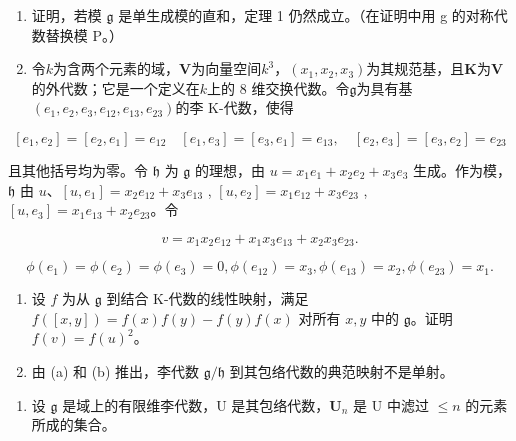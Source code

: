 \begin{enumerate}
\def\labelenumi{\arabic{enumi}.}
\setcounter{enumi}{7}
\item
  证明，若模 \(\mathfrak{g}\) 是单生成模的直和，定理 1 仍然成立。（在证明中用 g 的对称代数替换模 P。）
\item
  令\(k\)为含两个元素的域，\(\mathbf{V}\)为向量空间\(k^3\)，\((x_1, x_2, x_3)\)为其规范基，且\(\mathbf{K}\)为\(\mathbf{V}\)的外代数；它是一个定义在\(k\)上的 8 维交换代数。令\(\mathfrak{g}\)为具有基\((e_1, e_2, e_3, e_{12}, e_{13}, e_{23})\)的李 K-代数，使得
\end{enumerate}

\[
\left[ e _ {1}, e _ {2} \right] = \left[ e _ {2}, e _ {1} \right] = e _ {1 2} \quad \left[ e _ {1}, e _ {3} \right] = \left[ e _ {3}, e _ {1} \right] = e _ {1 3}, \quad \left[ e _ {2}, e _ {3} \right] = \left[ e _ {3}, e _ {2} \right] = e _ {2 3}
\]

且其他括号均为零。令 \(\mathfrak{h}\) 为 \(\mathfrak{g}\) 的理想，由 \(u = x_{1}e_{1} + x_{2}e_{2} + x_{3}e_{3}\) 生成。作为模，\(\mathfrak{h}\) 由 \(u\)、\([u, e_1] = x_2e_{12} + x_3e_{13}\) , \([u, e_2] = x_1e_{12} + x_3e_{23}\) , \([u, e_3] = x_1e_{13} + x_2e_{23}\)。令

\[
v = x _ {1} x _ {2} e _ {1 2} + x _ {1} x _ {3} e _ {1 3} + x _ {2} x _ {3} e _ {2 3}.
\]

\[
\phi \left(e _ {1}\right) = \phi \left(e _ {2}\right) = \phi \left(e _ {3}\right) = 0, \phi \left(e _ {1 2}\right) = x _ {3}, \phi \left(e _ {1 3}\right) = x _ {2}, \phi \left(e _ {2 3}\right) = x _ {1}.
\]

\begin{enumerate}
\def\labelenumi{(\alph{enumi})}
\setcounter{enumi}{1}
\item
  设 \(f\) 为从 \(\mathfrak{g}\) 到结合 K-代数的线性映射，满足 \(f([x,y]) = f(x)f(y) - f(y)f(x)\) 对所有 \(x, y\) 中的 \(\mathfrak{g}\)。证明 \(f(v) = f(u)^2\)。
\item
  由 (a) 和 (b) 推出，李代数 \(\mathfrak{g} / \mathfrak{h}\) 到其包络代数的典范映射不是单射。
\end{enumerate}

\begin{enumerate}
\def\labelenumi{\arabic{enumi}.}
\setcounter{enumi}{9}
\tightlist
\item
  设 \(\mathfrak{g}\) 是域上的有限维李代数，U 是其包络代数，\(\mathbf{U}_n\) 是 U 中滤过 \(\leqslant n\) 的元素所成的集合。
\end{enumerate}

